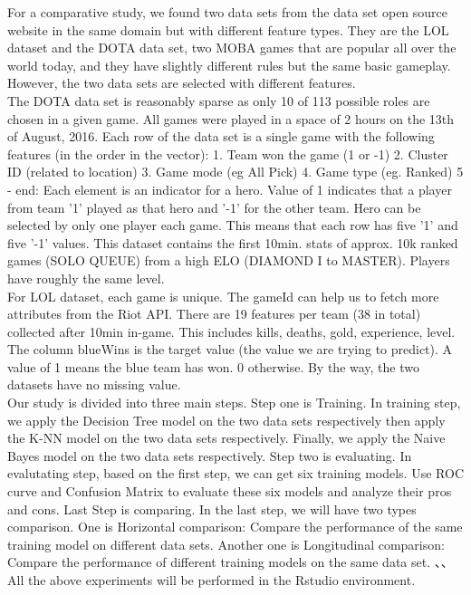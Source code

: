 \documentclass[a4paper,fleqn]{cas-sc}
\begin{document}
For a comparative study, we found two data sets from the data set open source website in the same domain but with different feature types. They are the LOL dataset and the DOTA data set, two MOBA games that are popular all over the world today, and they have slightly different rules but the same basic gameplay. However, the two data sets are selected with different features.\\
The DOTA data set is reasonably sparse as only 10 of 113 possible roles are chosen in a given game. All games were played in a space of 2 hours on the 13th of August, 2016. Each row of the data set is a single game with the following features (in the order in the vector): 1. Team won the game (1 or -1) 2. Cluster ID (related to location) 3. Game mode (eg All Pick) 4. Game type (eg. Ranked) 5 - end: Each element is an indicator for a hero. Value of 1 indicates that a player from team '1' played as that hero and '-1' for the other team. Hero can be selected by only one player each game. This means that each row has five '1' and five '-1' values. This dataset contains the first 10min. stats of approx. 10k ranked games (SOLO QUEUE) from a high ELO (DIAMOND I to MASTER). Players have roughly the same level.\\
For LOL dataset, each game is unique. The gameId can help us to fetch more attributes from the Riot API. There are 19 features per team (38 in total) collected after 10min in-game. This includes kills, deaths, gold, experience, level. The column blueWins is the target value (the value we are trying to predict). A value of 1 means the blue team has won. 0 otherwise. By the way, the two datasets have no missing value.\\
Our study is divided into three main steps. Step one is Training. In training step, we apply the Decision Tree model on the two data sets respectively then apply the K-NN model on the two data sets respectively. Finally, we apply the Naive Bayes model on the two data sets respectively. Step two is evaluating. In evalutating step, based on the first step, we can get six training models. Use ROC curve and Confusion Matrix to evaluate these six models and analyze their pros and cons. Last Step is comparing. In the last step, we will have two types comparison. One is Horizontal comparison: Compare the performance of the same training model on different data sets. Another one is Longitudinal comparison: Compare the performance of different training models on the same data set. 、、
All the above experiments will be performed in the Rstudio environment.
\end{document}
